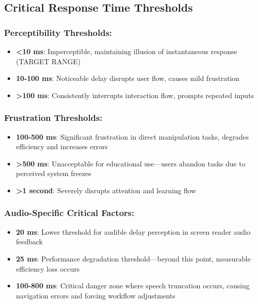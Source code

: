 \subsection{Critical Response Time Thresholds}\label{critical-response-time-thresholds}

\subsubsection{Perceptibility Thresholds:}

\begin{itemize}
	\item \textbf{<10 ms}: Imperceptible, maintaining illusion of instantaneous response (TARGET RANGE) \supercite{Nielsen1993UsabilityEngineering}
	\item \textbf{10-100 ms}: Noticeable delay disrupts user flow, causes mild frustration \supercite{Miller1968ReactionTime}
	\item \textbf{>100 ms}: Consistently interrupts interaction flow, prompts repeated inputs \supercite{Shneiderman1998DesigningTheUserInterface}
\end{itemize}


\subsubsection{Frustration Thresholds:}

\begin{itemize}
	\item \textbf{100-500 ms}: Significant frustration in direct manipulation tasks, degrades efficiency and increases errors \supercite{Card1983ThePsychologyOfHumanComputerInteraction}
	\item \textbf{>500 ms}: Unacceptable for educational use—users abandon tasks due to perceived system freezes \supercite{Sears1993TheEffectOfResponseTime}
	\item \textbf{>1 second}: Severely disrupts attention and learning flow \supercite{Dix2004HumanComputerInteraction}
\end{itemize}


\subsubsection{Audio-Specific Critical Factors:}

\begin{itemize}
	\item \textbf{20 ms}: Lower threshold for audible delay perception in screen reader audio feedback \supercite{Grunwald1999AuditoryLatency}
	\item \textbf{25 ms}: Performance degradation threshold—beyond this point, measurable efficiency loss occurs \supercite{Fowler2011ScreenReaderLatency}
	\item \textbf{100-800 ms}: Critical danger zone where speech truncation occurs, causing navigation errors and forcing workflow adjustments \supercite{Bigham2014UnderstandingScreenReaderUsage}
\end{itemize}


